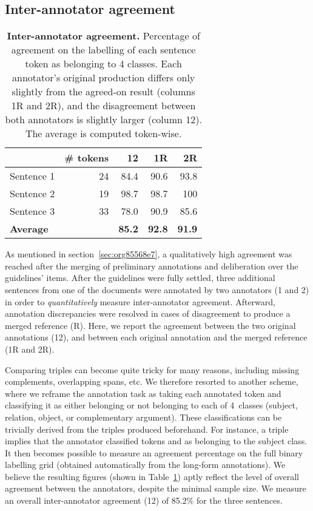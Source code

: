 \pdfoutput=1 \documentclass[11pt, a4paper]{article}
\begin{document}
\subsection{Inter-annotator agreement}

\begin{table}[hbt]
\centering
\begin{center}
\begin{tabular}{lrrrr}
 & \# tokens & 12 & 1R & 2R\\
\hline
Sentence 1 & 24 & 84.4 & 90.6 & 93.8\\
Sentence 2 & 19 & 98.7 & 98.7 & 100\\
Sentence 3 & 33 & 78.0 & 90.9 & 85.6\\
\hline
\textbf{Average} &  & \textbf{85.2} & \textbf{92.8} & \textbf{91.9}\\
\end{tabular}
\end{center}
\caption{\label{tab:IAA}\textbf{Inter-annotator agreement.} Percentage of agreement on the labelling of each sentence token as belonging to 4 classes. Each annotator's original production differs only slightly from the agreed-on result (columns 1R and 2R), and the disagreement between both annotators is slightly larger (column 12). The average is computed token-wise.}
\end{table}

As mentioned in section~\ref{sec:org85568e7}, a qualitatively high agreement was reached after the merging of preliminary annotations and deliberation over the guidelines' items. After the guidelines were fully settled, three additional sentences from one of the documents were annotated by two annotators (1 and 2) in order to \textit{quantitatively} measure inter-annotator agreement. 
Afterward, annotation discrepancies were resolved in cases of disagreement to produce a merged reference (R). 
Here, we report the agreement between the two original annotations (12), and between each original annotation and the merged reference (1R and 2R). 

Comparing triples can become quite tricky for many reasons, including missing complements, overlapping spans, etc. We therefore resorted to another scheme, where we reframe the annotation task as taking each annotated token and classifying it as either belonging or not belonging to each of 4~classes (subject, relation, object, or complementary argument). These classifications can be trivially derived from the triples produced beforehand. For instance, a triple  implies that the annotator classified tokens  and  as belonging to the subject class. It then becomes possible to measure an agreement percentage on the
full binary labelling grid (obtained automatically from the long-form annotations). We believe the resulting figures (shown in Table~\ref{tab:IAA}) aptly reflect the level of overall agreement between the annotators, despite the minimal sample size. We measure an overall inter-annotator agreement (12) of 85.2\% for the three sentences.
\end{document}
